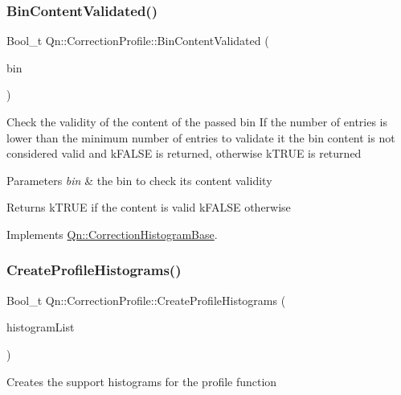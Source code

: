 \subsubsection{\texorpdfstring{Bin\+Content\+Validated()}{BinContentValidated()}}
{\footnotesize\ttfamily Bool\+\_\+t Qn\+::\+Correction\+Profile\+::\+Bin\+Content\+Validated (\begin{DoxyParamCaption}\item[{Long64\+\_\+t}]{bin }\end{DoxyParamCaption})\hspace{0.3cm}{\ttfamily [virtual]}}

Check the validity of the content of the passed bin If the number of entries is lower than the minimum number of entries to validate it the bin content is not considered valid and k\+F\+A\+L\+SE is returned, otherwise k\+T\+R\+UE is returned 
\begin{DoxyParams}{Parameters}
{\em bin} & the bin to check its content validity \\
\hline
\end{DoxyParams}
\begin{DoxyReturn}{Returns}
k\+T\+R\+UE if the content is valid k\+F\+A\+L\+SE otherwise 
\end{DoxyReturn}


Implements \mbox{\hyperlink{classQn_1_1CorrectionHistogramBase_a4db2c92ceaffefaa91475a721612d80d}{Qn\+::\+Correction\+Histogram\+Base}}.

\mbox{\label{classQn_1_1CorrectionProfile_acdc3507cbdb49bef3fe821302635ca40}} 
\subsubsection{\texorpdfstring{Create\+Profile\+Histograms()}{CreateProfileHistograms()}}
{\footnotesize\ttfamily Bool\+\_\+t Qn\+::\+Correction\+Profile\+::\+Create\+Profile\+Histograms (\begin{DoxyParamCaption}\item[{T\+List $\ast$}]{histogram\+List }\end{DoxyParamCaption})}

Creates the support histograms for the profile function

